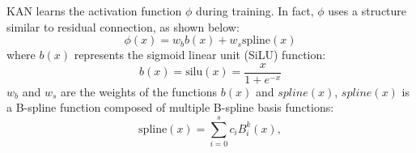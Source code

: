 \documentclass{article}
\begin{document}
KAN learns the activation function \(\phi\) during training. In fact, \(\phi\) uses a structure similar to residual connection, as shown below:
\begin{equation}
\phi(x) = w_b b(x) + w_s \text{spline}(x)
\end{equation}
where \(b(x)\) represents the sigmoid linear unit (SiLU) function:
\begin{equation}
b(x) = \text{silu}(x) = \frac{x}{1 + e^{-x}}
\end{equation}
\( w_b \) and \( w_s \) are the weights of the functions \(b(x)\) and \(spline(x)\), \(spline(x)\) is a B-spline function composed of multiple B-spline basis functions:
\begin{equation}
\text{spline}(x) = \sum_{i=0}^{s} c_i B_i^k(x),
\end{equation}
\end{document}
